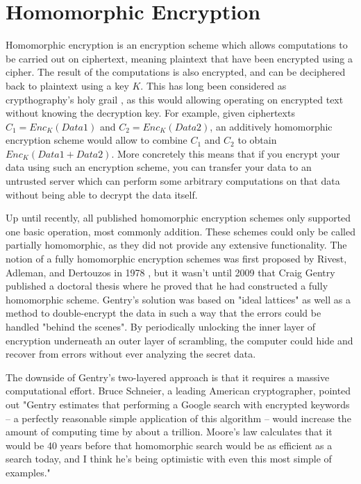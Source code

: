 

\section{Homomorphic Encryption}
Homomorphic encryption is an encryption scheme which allows computations to be carried out on ciphertext, meaning plaintext that have been encrypted using a cipher. The result of the computations is also encrypted, and can be deciphered back to plaintext using a key $K$. This has long been considered as crypthography's holy grail \cite{Micciancio2011HomoEnc}, as this would allowing operating on encrypted text without knowing the decryption key. For example, given ciphertexts $C_1=Enc_K(Data1)$ and $C_2=Enc_K(Data2)$, an additively homomorphic encryption scheme would allow to combine $C_1$ and $C_2$ to obtain $Enc_K(Data1+Data2)$. More concretely this means that if you encrypt your data using such an encryption scheme, you can transfer your data to an untrusted server which can perform some arbitrary computations on that data without being able to decrypt the data itself.

Up until recently, all published homomorphic encryption schemes only supported one basic operation, most commonly addition. These schemes could only be called partially homomorphic, as they did not provide any extensive functionality. The notion of a  fully homomorphic encryption schemes was first proposed by Rivest, Adleman, and Dertouzos in 1978 \cite{rivest1978data}, but it wasn't until 2009 that Craig Gentry published a doctoral thesis where he proved that he had constructed a fully homomorphic scheme\cite{gentry2009FHEpaper}. Gentry's solution was based on "ideal lattices" as well as a method to double-encrypt the data in such a way that the errors could be handled "behind the scenes". By periodically unlocking the inner layer of encryption underneath an outer layer of scrambling, the computer could hide and recover from errors without ever analyzing the secret data. 

The downside of Gentry's two-layered approach is that it requires a massive computational effort. Bruce Schneier, a leading American cryptographer, pointed out "Gentry estimates that performing a Google search with encrypted keywords -- a perfectly reasonable simple application of this algorithm -- would increase the amount of computing time by about a trillion. Moore's law calculates that it would be 40 years before that homomorphic search would be as efficient as a search today, and I think he's being optimistic with even this most simple of examples\cite{schneier2009blog}." 




\cleardoublepage
